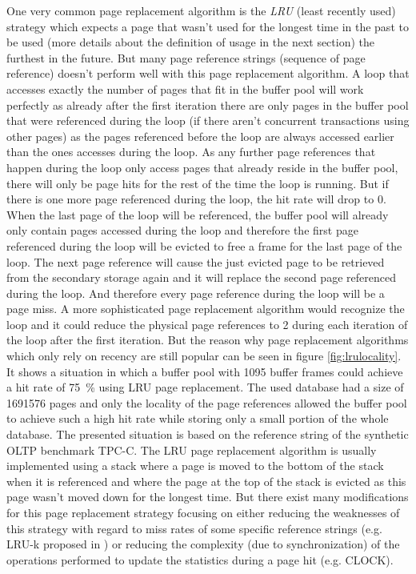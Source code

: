     One very common page replacement algorithm is the \emph{LRU} (least recently used) strategy which expects a page that wasn't used for the longest time in the past to be used (more details about the definition of usage in the next section) the furthest in the future. But many page reference strings (sequence of page reference) doesn't perform well with this page replacement algorithm. A loop that accesses exactly the number of pages that fit in the buffer pool will work perfectly as already after the first iteration there are only pages in the buffer pool that were referenced during the loop (if there aren't concurrent transactions using other pages) as the pages referenced before the loop are always accessed earlier than the ones accesses during the loop. As any further page references that happen during the loop only access pages that already reside in the buffer pool, there will only be page hits for the rest of the time the loop is running. But if there is one more page referenced during the loop, the hit rate will drop to $0$. When the last page of the loop will be referenced, the buffer pool will already only contain pages accessed during the loop and therefore the first page referenced during the loop will be evicted to free a frame for the last page of the loop. The next page reference will cause the just evicted page to be retrieved from the secondary storage again and it will replace the second page referenced during the loop. And therefore every page reference during the loop will be a page miss. A more sophisticated page replacement algorithm would recognize the loop and it could reduce the physical page references to \num{2} during each iteration of the loop after the first iteration. But the reason why page replacement algorithms which only rely on recency are still popular can be seen in figure \ref{fig:lrulocality}. It shows a situation in which a buffer pool with \num{1095} buffer frames could achieve a hit rate of \SI{75}{\percent} using LRU page replacement. The used database had a size of \num{1691576} pages and only the locality of the page references allowed the buffer pool to achieve such a high hit rate while storing only a small portion of the whole database. The presented situation is based on the reference string of the synthetic OLTP benchmark TPC-C. The LRU page replacement algorithm is usually implemented using a stack where a page is moved to the bottom of the stack when it is referenced and where the page at the top of the stack is evicted as this page wasn't moved down for the longest time. But there exist many modifications for this page replacement strategy focusing on either reducing the weaknesses of this strategy with regard to miss rates of some specific reference strings (e.g. LRU-k proposed in \cite{ONeil:1993}) or reducing the complexity (due to synchronization) of the operations performed to update the statistics during a page hit (e.g. CLOCK).

